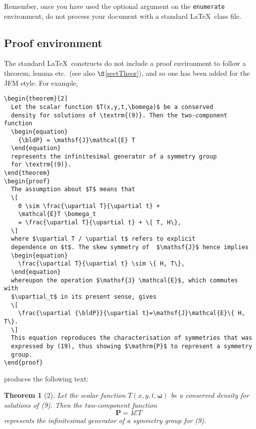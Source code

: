 \documentclass{jfm}
\providecommand\upartial{\partial}%
\providecommand\upartial{\partial}%
\providecommand\bomega{\boldsymbol{\omega}}
\newcommand\bldP{\boldsymbol{P}}
\newcommand\etc{etc.\ }
\newtheorem{theorem}{Theorem}[section]
\begin{document}
Remember, once you have used the optional argument on the \verb"enumerate"
environment, do not process your document with a standard \LaTeX\ class file.

\subsection{Proof environment}

The standard \LaTeX\ constructs do not include a proof environment to
follow a theorem, lemma \etc (see also $\S$\ref{sectTheor}), and so one has
been added for the JFM style. For example,
%
\begin{verbatim}
\begin{theorem}[2]
  Let the scalar function $T(x,y,t,\bomega)$ be a conserved
  density for solutions of \textrm{(9)}. Then the two-component function
  \begin{equation}
    {\bldP} = \mathsf{J}\mathcal{E} T
  \end{equation}
  represents the infinitesimal generator of a symmetry group
  for \textrm{(9)}.
\end{theorem}
\begin{proof}
  The assumption about $T$ means that
  \[
    0 \sim \frac{\upartial T}{\upartial t} +
    \mathcal{E}T \bomega_t
    = \frac{\upartial T}{\upartial t} + \{ T, H\},
  \]
  where $\upartial T / \upartial t$ refers to explicit
  dependence on $t$. The skew symmetry of  $\mathsf{J}$ hence implies
  \begin{equation}
    \frac{\upartial T}{\upartial t} \sim \{ H, T\},
  \end{equation}
  whereupon the operation $\mathsf{J} \mathcal{E}$, which commutes with
  $\upartial_t$ in its present sense, gives
  \[
    \frac{\upartial {\bldP}}{\upartial t}=\mathsf{J}\mathcal{E}\{ H, T\}.
  \]
  This equation reproduces the characterisation of symmetries that was
  expressed by (19), thus showing $\mathrm{P}$ to represent a symmetry
  group.
\end{proof}
\end{verbatim}
%
produces the following text:
%
\begin{theorem}[2]
  Let the scalar function $T(x,y,t,\bomega)$ be a conserved
  density for solutions of \textrm{(9)}. Then the two-component function
  \begin{equation}
    {\bldP} = \mathsf{J}\mathcal{E} T
  \end{equation}
  represents the infinitesimal generator of a symmetry group
  for \textrm{(9)}.
\end{theorem}
\end{document}
